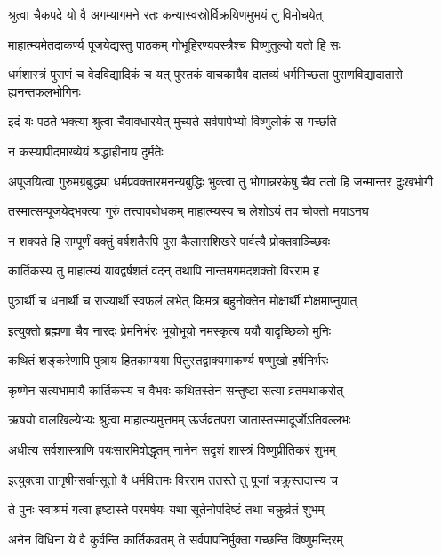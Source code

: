 \twolineshloka
{श्रुत्वा चैकपदे यो वै अगम्यागमने रतः}
{कन्यास्वस्रोर्विक्रयिणमुभयं तु विमोचयेत्} %

\twolineshloka
{माहात्म्यमेतदाकर्ण्य पूजयेद्यस्तु पाठकम्}
{गोभूहिरण्यवस्त्रैश्च विष्णुतुल्यो यतो हि सः} %

\threelineshloka
{धर्मशास्त्रं पुराणं च वेदविद्यादिकं च यत्}
{पुस्तकं वाचकायैव दातव्यं धर्ममिच्छता}
{पुराणविद्यादातारो ह्यनन्तफलभोगिनः} %

\twolineshloka
{इदं यः पठते भक्त्या श्रुत्वा चैवावधारयेत्}
{मुच्यते सर्वपापेभ्यो विष्णुलोकं स गच्छति} %


\onelineshloka
{न कस्यापीदमाख्येयं श्रद्धाहीनाय दुर्मतेः} %

\fourlineindentedshloka
{अपूजयित्वा गुरुमग्रबुद्ध्या}
{धर्मप्रवक्तारमनन्यबुद्धिः}
{भुक्त्वा तु भोगान्नरकेषु चैव}
{ततो हि जन्मान्तर दुःखभोगी} %

\twolineshloka
{तस्मात्सम्पूजयेद्भक्त्या गुरुं तत्त्वावबोधकम्}
{माहात्म्यस्य च लेशोऽयं तव चोक्तो मयाऽनघ} %

\twolineshloka
{न शक्यते हि सम्पूर्णं वक्तुं वर्षशतैरपि}
{पुरा कैलासशिखरे पार्वत्यै प्रोक्तवाञ्च्छिवः} %

\twolineshloka
{कार्तिकस्य तु माहात्म्यं यावद्वर्षशतं वदन्}
{तथापि नान्तमगमदशक्तो विरराम ह} %

\twolineshloka
{पुत्रार्थी च धनार्थी च राज्यार्थी स्वफलं लभेत्}
{किमत्र बहुनोक्तेन मोक्षार्थी मोक्षमाप्नुयात्} %


\twolineshloka
{इत्युक्तो ब्रह्मणा चैव नारदः प्रेमनिर्भरः}
{भूयोभूयो नमस्कृत्य ययौ यादृच्छिको मुनिः} %

\twolineshloka
{कथितं शङ्करेणापि पुत्राय हितकाम्यया}
{पितुस्तद्वाक्यमाकर्ण्य षण्मुखो हर्षनिर्भरः} %

\twolineshloka
{कृष्णेन सत्यभामायै कार्तिकस्य च वैभवः}
{कथितस्तेन सन्तुष्टा सत्या व्रतमथाकरोत्} %

\twolineshloka
{ऋषयो वालखिल्येभ्यः श्रुत्वा माहात्म्यमुत्तमम्}
{ऊर्जव्रतपरा जातास्तस्मादूर्जोऽतिवल्लभः} %

\twolineshloka
{अधीत्य सर्वशास्त्राणि पयःसारमिवोद्धृतम्}
{नानेन सदृशं शास्त्रं विष्णुप्रीतिकरं शुभम्} %


\twolineshloka
{इत्युक्त्वा तानृषीन्सर्वान्सूतो वै धर्मवित्तमः}
{विरराम ततस्ते तु पूजां चक्रुस्तदास्य च} %

\twolineshloka
{ते पुनः स्वाश्रमं गत्वा हृष्टास्ते परमर्षयः}
{यथा सूतेनोपदिष्टं तथा चक्रुर्व्रतं शुभम्} %

\twolineshloka
{अनेन विधिना ये वै कुर्वन्ति कार्तिकव्रतम्}
{ते सर्वपापनिर्मुक्ता गच्छन्ति विष्णुमन्दिरम्} %



\endgroup
